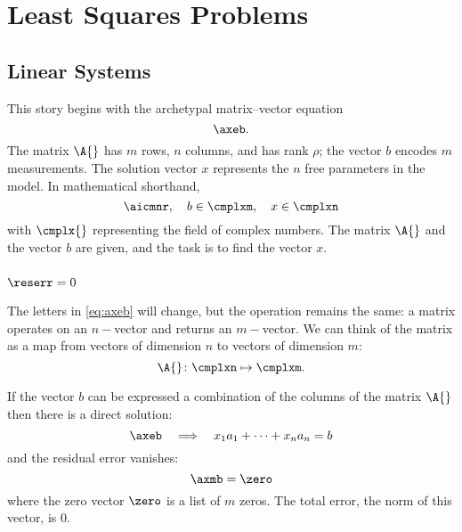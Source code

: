 \chapter{\label{ch:least squares problem}Least Squares Problems}

\section{\label{sec:linear systems}Linear Systems}  %

  This story begins with the archetypal  matrix--vector equation
  \begin{equation}   %
    \axeb .
    \label{eq:axeb}
  \end{equation}
The matrix $\A{}$ has $m$ rows, $n$ columns, and has rank $\rho$; the vector $b$ encodes $m$ measurements. The solution vector $x$ represents the $n$ free parameters in the model. In mathematical shorthand,
  \begin{equation}   %
    \aicmnr, \quad b \in \cmplxm, \quad x \in \cmplxn
  \label{eq:basics}
  \end{equation}
with $\cmplx{}$ representing the field of complex numbers. The matrix $\A{}$ and the vector $b$ are given, and the task is to find the vector $x$.

\subsection{\label{ssec:exact soln}$\reserr = 0$}  %
The letters in \eqref{eq:axeb} will change, but the operation remains the same: a matrix operates on an $n-$vector and returns an $m-$vector. We can think of the  matrix as a map from vectors of dimension $n$ to vectors of dimension $m$:
  \begin{equation*}   %
    \A{} \colon \cmplxn \mapsto \cmplxm .
  \end{equation*}

If the vector $b$ can be expressed a combination of the columns of the matrix $\A{}$ then there is a direct solution:
\begin{equation*}
    \axeb \quad \Longrightarrow \quad x_{1} a_{1} + \cdots + x_{n} a_{n} = b
\end{equation*}
and the residual error  vanishes:
  \begin{equation*}   %
      \axmb = \zero
  \end{equation*}
where the zero vector $\zero$ is a list of $m$ zeros. The total error, the norm of this vector, is 0.

